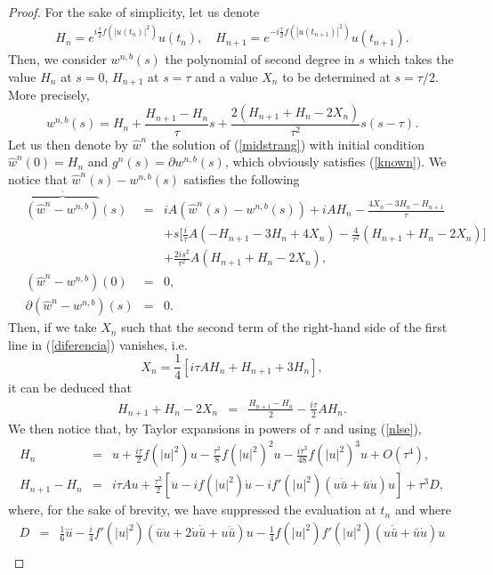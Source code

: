\documentclass[10pt,a4paper]{amsart}
\begin{document}
\begin{proof}
For the sake of simplicity, let us denote
\begin{eqnarray}
H_n=e^{i \frac{\tau}{2}f(|u(t_n)|^2)}u(t_n), \quad H_{n+1}=e^{-i \frac{\tau}{2}f(|u(t_{n+1})|^2)}u(t_{n+1}).
\label{HH}
\end{eqnarray}
Then, we consider $w^{n,b}(s)$ the polynomial of second degree in $s$ which takes the value $H_n$ at $s=0$, $H_{n+1}$ at $s=\tau$ and a value $X_n$ to be determined at $s=\tau/2$. More precisely,
$$
w^{n,b}(s)=H_n+\frac{H_{n+1}-H_n}{\tau}s+\frac{2(H_{n+1}+H_n-2 X_n)}{\tau^2}s(s-\tau).$$
Let us then denote by $\hat{w}^n$ the solution of (\ref{midstrang}) with initial condition $\hat{w}^n(0)=H_n$ and $g^n(s)=\partial w^{n,b}(s)$, which obviously satisfies (\ref{known}). We notice that $\hat{w}^n(s)-w^{n,b}(s)$ satisfies the following
\begin{eqnarray}
\quad \stackrel{\cdot}{\overbrace{(\hat{w}^n-w^{n,b})}}(s)&=&i A (\hat{w}^n(s)-w^{n,b}(s))+i A H_n-\frac{4 X_n-3 H_n-H_{n+1}}{\tau} \nonumber \\
\quad &&+s \big[\frac{i}{\tau}A(-H_{n+1}-3 H_n+4 X_n)-\frac{4}{\tau^2}(H_{n+1}+H_n-2 X_n)\big] \nonumber \\
\quad &&+\frac{2 i s^2}{\tau^2}A(H_{n+1}+H_n-2 X_n), \nonumber \\
\quad (\hat{w}^n-w^{n,b})(0)&=&0, \nonumber \\
\quad \partial (\hat{w}^n-w^{n,b})(s)&=&0. \label{diferencia}
\end{eqnarray}
Then, if we take $X_n$ such that the second term of the right-hand side of the first line in (\ref{diferencia}) vanishes, i.e.
$$X_n=\frac{1}{4}[ i \tau A H_n+H_{n+1}+3 H_n],$$
it can be deduced that
\begin{eqnarray}
H_{n+1}+H_n-2 X_n&=&\frac{H_{n+1}-H_n}{2}-\frac{i \tau}{2} A H_n. \nonumber
\end{eqnarray}
We then notice that, by Taylor expansions in powers of $\tau$ and using (\ref{nlse}),
\begin{eqnarray}
H_n&=&u+\frac{i \tau}{2}f(|u|^2)u-\frac{\tau^2}{8}f(|u|^2)^2 u- \frac{i \tau^3}{48} f(|u|^2)^3 u +O(\tau^4), \nonumber \\
H_{n+1}-H_n&=& i \tau A u+\frac{\tau^2}{2}[\ddot{u}-i f(|u|^2) \dot{u}-i f'(|u|^2)(u \dot{\bar{u}}+\bar{u}\dot{u})u]+\tau^3 D, \nonumber
\end{eqnarray}
where, for the sake of brevity, we have suppressed the evaluation at $t_n$ and where
\begin{eqnarray}
D&=&\frac{1}{6}\stackrel{\dots}{u}-\frac{i}{4}f'(|u|^2)(\bar{u}\ddot{u}+2 \dot{u}\dot{\bar{u}}+u \ddot{\bar{u}})u-\frac{1}{4}f(|u|^2)f'(|u|^2)(u\dot{\bar{u}}+\bar{u}\dot{u})u \nonumber \\

\end{eqnarray}
\end{proof}
\end{document}
